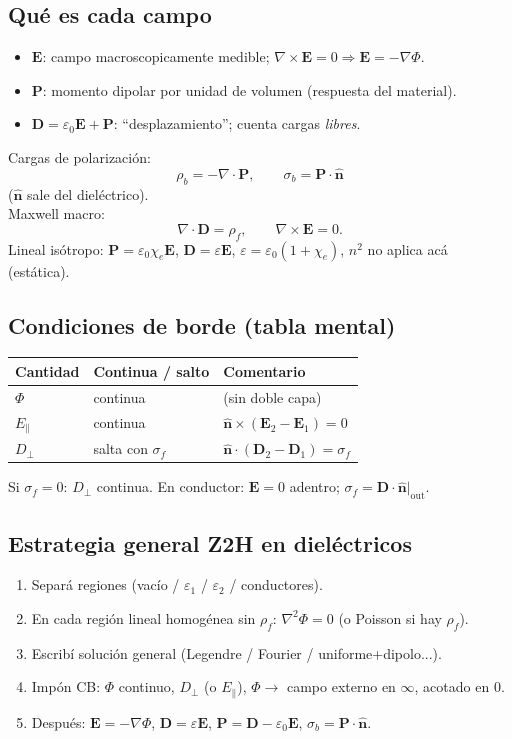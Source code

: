 \documentclass[10pt,a4paper]{article}
\newcommand{\vect}[1]{\mathbf{#1}}
\newcommand{\uv}[1]{\hat{\mathbf{#1}}}
\newcommand{\eps}{\varepsilon}
\newcommand{\epso}{\varepsilon_0}
\begin{document}
\subsection{Qué es cada campo}
\begin{itemize}
\item $\vect{E}$: campo macroscopicamente medible; $\nabla\times\vect{E}=0\Rightarrow\vect{E}=-\nabla\Phi$.
\item $\vect{P}$: momento dipolar por unidad de volumen (respuesta del material).
\item $\vect{D}=\epso\vect{E}+\vect{P}$: ``desplazamiento''; cuenta cargas \emph{libres}.
\end{itemize}
Cargas de polarización:
\[
\rho_b=-\nabla\cdot\vect{P},\qquad\sigma_b=\vect{P}\cdot\uv{n}
\]
($\uv{n}$ sale del dieléctrico).\\
Maxwell macro:
\[
\nabla\cdot\vect{D}=\rho_f,\qquad\nabla\times\vect{E}=0.
\]
Lineal isótropo: $\vect{P}=\epso\chi_e\vect{E}$, $\vect{D}=\eps\vect{E}$, $\eps=\epso(1+\chi_e)$, $n^2$ no aplica acá (estática).

\subsection{Condiciones de borde (tabla mental)}
\begin{center}
\begin{tabular}{@{}lll@{}}
\toprule
Cantidad & Continua / salto & Comentario\\
\midrule
$\Phi$ & continua & (sin doble capa)\\
$E_\parallel$ & continua & $\uv{n}\times(\vect{E}_2-\vect{E}_1)=0$\\
$D_\perp$ & salta con $\sigma_f$ & $\uv{n}\cdot(\vect{D}_2-\vect{D}_1)=\sigma_f$\\
\bottomrule
\end{tabular}
\end{center}
Si $\sigma_f=0$: $D_\perp$ continua. En conductor: $\vect{E}=0$ adentro; $\sigma_f=\vect{D}\cdot\uv{n}|_{\mathrm{out}}$.

\subsection{Estrategia general Z2H en dieléctricos}
\begin{enumerate}
\item Separá regiones (vacío / $\eps_1$ / $\eps_2$ / conductores).
\item En cada región lineal homogénea sin $\rho_f$: $\nabla^2\Phi=0$ (o Poisson si hay $\rho_f$).
\item Escribí solución general (Legendre / Fourier / uniforme+dipolo...).
\item Impón CB: $\Phi$ continuo, $D_\perp$ (o $E_\parallel$), $\Phi\to$ campo externo en $\infty$, acotado en $0$.
\item Después: $\vect{E}=-\nabla\Phi$, $\vect{D}=\eps\vect{E}$, $\vect{P}=\vect{D}-\epso\vect{E}$, $\sigma_b=\vect{P}\cdot\uv{n}$.
\end{enumerate}
\end{document}
